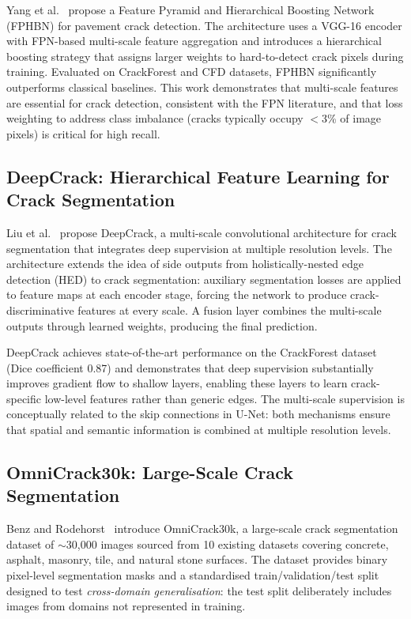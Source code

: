 \documentclass[12pt,a4paper]{article}
\begin{document}
Yang et al.~\cite{yang2019fphb} propose a Feature Pyramid and Hierarchical Boosting Network (FPHBN) for pavement crack detection. The architecture uses a VGG-16 encoder with FPN-based multi-scale feature aggregation and introduces a hierarchical boosting strategy that assigns larger weights to hard-to-detect crack pixels during training. Evaluated on CrackForest and CFD datasets, FPHBN significantly outperforms classical baselines. This work demonstrates that multi-scale features are essential for crack detection, consistent with the FPN literature, and that loss weighting to address class imbalance (cracks typically occupy $<$3\% of image pixels) is critical for high recall.

\subsection{DeepCrack: Hierarchical Feature Learning for Crack Segmentation}

Liu et al.~\cite{liu2019deepcrack} propose DeepCrack, a multi-scale convolutional architecture for crack segmentation that integrates deep supervision at multiple resolution levels. The architecture extends the idea of side outputs from holistically-nested edge detection (HED) to crack segmentation: auxiliary segmentation losses are applied to feature maps at each encoder stage, forcing the network to produce crack-discriminative features at every scale. A fusion layer combines the multi-scale outputs through learned weights, producing the final prediction.

DeepCrack achieves state-of-the-art performance on the CrackForest dataset (Dice coefficient 0.87) and demonstrates that deep supervision substantially improves gradient flow to shallow layers, enabling these layers to learn crack-specific low-level features rather than generic edges. The multi-scale supervision is conceptually related to the skip connections in U-Net: both mechanisms ensure that spatial and semantic information is combined at multiple resolution levels.

\subsection{OmniCrack30k: Large-Scale Crack Segmentation}

Benz and Rodehorst~\cite{benz2022omnicrack} introduce OmniCrack30k, a large-scale crack segmentation dataset of $\sim$30{,}000 images sourced from 10 existing datasets covering concrete, asphalt, masonry, tile, and natural stone surfaces. The dataset provides binary pixel-level segmentation masks and a standardised train/validation/test split designed to test \textit{cross-domain generalisation}: the test split deliberately includes images from domains not represented in training.
\end{document}
